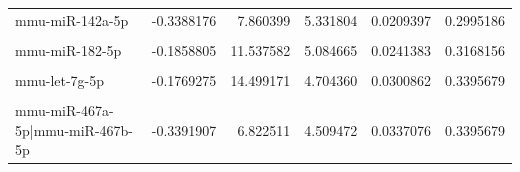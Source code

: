 \documentclass[12pt,twoside]{reedthesis}
\begin{document}
\begin{table}[H]
{\begin{tabular}[t]{lrrrrr}
mmu-miR-142a-5p & -0.3388176 & 7.860399 & 5.331804 & 0.0209397 & 0.2995186\\
\cellcolor{gray!6}{mmu-miR-484} & \cellcolor{gray!6}{-0.4464519} & \cellcolor{gray!6}{7.035887} & \cellcolor{gray!6}{5.294393} & \cellcolor{gray!6}{0.0213942} & \cellcolor{gray!6}{0.2995186}\\
\addlinespace
mmu-miR-182-5p & -0.1858805 & 11.537582 & 5.084665 & 0.0241383 & 0.3168156\\
\cellcolor{gray!6}{mmu-miR-183-5p} & \cellcolor{gray!6}{-0.2106265} & \cellcolor{gray!6}{11.356649} & \cellcolor{gray!6}{4.759219} & \cellcolor{gray!6}{0.0291418} & \cellcolor{gray!6}{0.3395679}\\
mmu-let-7g-5p & -0.1769275 & 14.499171 & 4.704360 & 0.0300862 & 0.3395679\\
\cellcolor{gray!6}{mmu-miR-181d-5p} & \cellcolor{gray!6}{0.2729988} & \cellcolor{gray!6}{7.492399} & \cellcolor{gray!6}{4.642132} & \cellcolor{gray!6}{0.0311962} & \cellcolor{gray!6}{0.3395679}\\
mmu-miR-467a-5p|mmu-miR-467b-5p & -0.3391907 & 6.822511 & 4.509472 & 0.0337076 & 0.3395679\\
\bottomrule
\end{tabular}}
\end{table}
\begin{table}[H]

\caption{\label{tab:est2}Supplementary table 2}
\centering
{}
\end{table}
\end{document}

